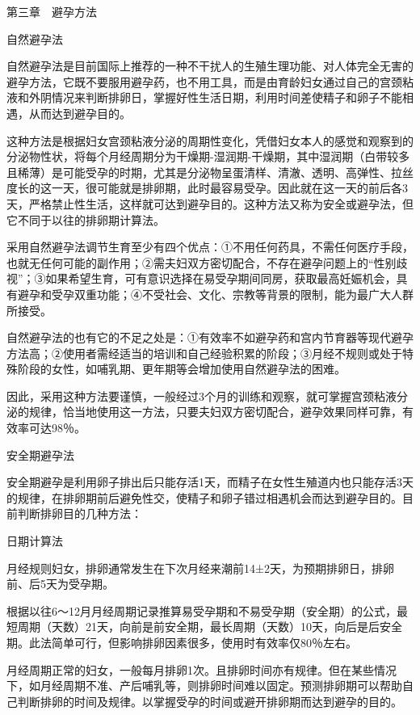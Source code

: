\documentclass[12pt,UTF8]{ctexbook}
\begin{document}
第三章　避孕方法


自然避孕法


自然避孕法是目前国际上推荐的一种不干扰人的生殖生理功能、对人体完全无害的避孕方法，它既不要服用避孕药，也不用工具，而是由育龄妇女通过自己的宫颈粘液和外阴情况来判断排卵日，掌握好性生活日期，利用时间差使精子和卵子不能相遇，从而达到避孕目的。

这种方法是根据妇女宫颈粘液分泌的周期性变化，凭借妇女本人的感觉和观察到的分泌物性状，将每个月经周期分为干燥期-湿润期-干燥期，其中湿润期（白带较多且稀薄）是可能受孕的时期，尤其是分泌物呈蛋清样、清澈、透明、高弹性、拉丝度长的这一天，很可能就是排卵期，此时最容易受孕。因此就在这一天的前后各3天，严格禁止性生活，这样就可达到避孕目的。这种方法又称为安全或避孕法，但它不同于以往的排卵期计算法。

采用自然避孕法调节生育至少有四个优点：①不用任何药具，不需任何医疗手段，也就无任何可能的副作用；②需夫妇双方密切配合，不存在避孕问题上的“性别歧视”；③如果希望生育，可有意识选择在易受孕期间同房，获取最高妊娠机会，具有避孕和受孕双重功能；④不受社会、文化、宗教等背景的限制，能为最广大人群所接受。

自然避孕法的也有它的不足之处是：①有效率不如避孕药和宫内节育器等现代避孕方法高；②使用者需经适当的培训和自己经验积累的阶段；③月经不规则或处于特殊阶段的女性，如哺乳期、更年期等会增加使用自然避孕法的困难。

因此，采用这种方法要谨慎，一般经过3个月的训练和观察，就可掌握宫颈粘液分泌的规律，恰当地使用这一方法，只要夫妇双方密切配合，避孕效果同样可靠，有效率可达98％。





安全期避孕法


安全期避孕是利用卵子排出后只能存活1天，而精子在女性生殖道内也只能存活3天的规律，在排卵期前后避免性交，使精子和卵子错过相遇机会而达到避孕目的。目前判断排卵目的几种方法：

日期计算法

月经规则妇女，排卵通常发生在下次月经来潮前14±2天，为预期排卵日，排卵前、后5天为受孕期。

根据以往6～12月月经周期记录推算易受孕期和不易受孕期（安全期）的公式，最短周期（天数）21天，向前是前安全期，最长周期（天数）10天，向后是后安全期。此法简单可行，但影响排卵因素很多，使用时有效率仅80％左右。

月经周期正常的妇女，一般每月排卵1次。且排卵时间亦有规律。但在某些情况下，如月经周期不准、产后哺乳等，则排卵时间难以固定。预测排卵期可以帮助自己判断排卵的时间及规律。以掌握受孕的时间或避开排卵期而达到避孕的目的。
\end{document}
